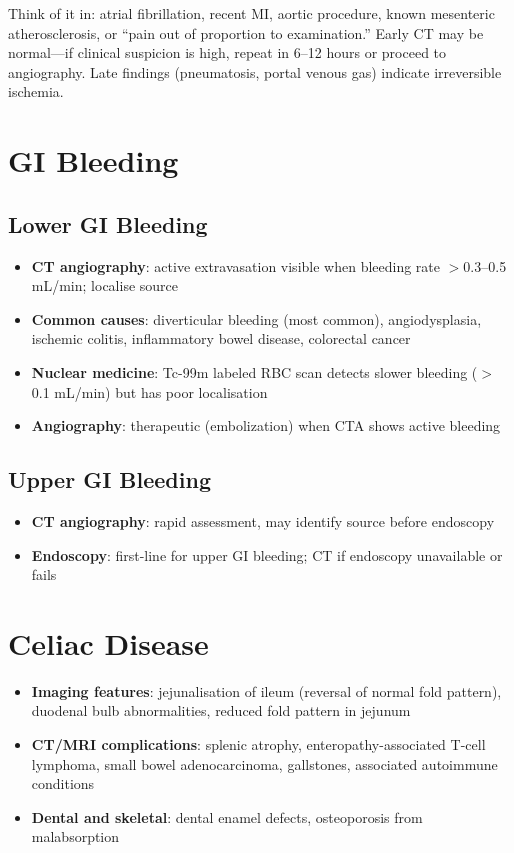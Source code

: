 \begin{pearlbox}
Think of it in: atrial fibrillation, recent MI, aortic procedure, known mesenteric atherosclerosis, or ``pain out of proportion to examination.'' Early CT may be normal---if clinical suspicion is high, repeat in 6--12 hours or proceed to angiography. Late findings (pneumatosis, portal venous gas) indicate irreversible ischemia.
\end{pearlbox}

\section{GI Bleeding}

\subsection{Lower GI Bleeding}
\begin{itemize}
  \item \textbf{CT angiography}: active extravasation visible when bleeding rate $>$0.3--0.5 mL/min; localise source
  \item \textbf{Common causes}: diverticular bleeding (most common), angiodysplasia, ischemic colitis, inflammatory bowel disease, colorectal cancer
  \item \textbf{Nuclear medicine}: Tc-99m labeled RBC scan detects slower bleeding ($>$0.1 mL/min) but has poor localisation
  \item \textbf{Angiography}: therapeutic (embolization) when CTA shows active bleeding
\end{itemize}

\subsection{Upper GI Bleeding}
\begin{itemize}
  \item \textbf{CT angiography}: rapid assessment, may identify source before endoscopy
  \item \textbf{Endoscopy}: first-line for upper GI bleeding; CT if endoscopy unavailable or fails
\end{itemize}

\section{Celiac Disease}
\begin{itemize}
  \item \textbf{Imaging features}: jejunalisation of ileum (reversal of normal fold pattern), duodenal bulb abnormalities, reduced fold pattern in jejunum
  \item \textbf{CT/MRI complications}: splenic atrophy, enteropathy-associated T-cell lymphoma, small bowel adenocarcinoma, gallstones, associated autoimmune conditions
  \item \textbf{Dental and skeletal}: dental enamel defects, osteoporosis from malabsorption
\end{itemize}

